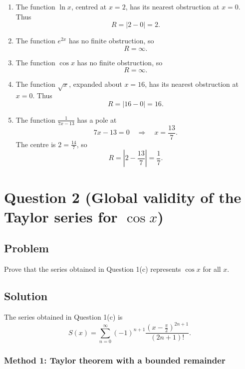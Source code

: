 \documentclass[12pt]{article}
\begin{document}
\begin{enumerate}[label=(\alph*)]

\item
The function \(\ln x\), centred at \(x=2\), has its nearest obstruction at \(x=0\).
Thus
\[
R=|2-0|=\boxed{2}.
\]

\item
The function \(e^{2x}\) has no finite obstruction, so
\[
\boxed{R=\infty.}
\]

\item
The function \(\cos x\) has no finite obstruction, so
\[
\boxed{R=\infty.}
\]

\item
The function \(\sqrt{x}\), expanded about \(x=16\), has its nearest obstruction at \(x=0\).
Thus
\[
R=|16-0|=\boxed{16}.
\]

\item
The function \(\frac1{7x-13}\) has a pole at
\[
7x-13=0
\quad\Longrightarrow\quad
x=\frac{13}{7}.
\]
The centre is \(2=\frac{14}{7}\), so
\[
R=\left|2-\frac{13}{7}\right|=\boxed{\frac17}.
\]

\end{enumerate}


\newpage
\section{Question 2 (Global validity of the Taylor series for \(\cos x\))}

\subsection{Problem}
Prove that the series obtained in Question 1(c) represents \(\cos x\) for all \(x\).




\bigskip
\subsection{Solution}

The series obtained in Question 1(c) is
\[
S(x)=
\sum_{n=0}^{\infty}(-1)^{n+1}
\frac{\left(x-\frac{\pi}{2}\right)^{2n+1}}{(2n+1)!}.
\]

\subsubsection{Method 1: Taylor theorem with a bounded remainder}
\end{document}
